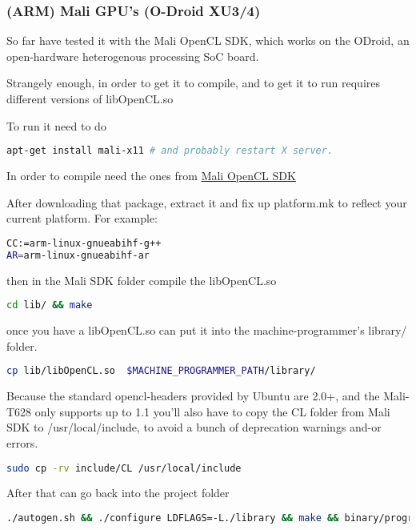 \documentclass[12pt]{article}
\begin{document}
\subsubsection{(ARM) Mali GPU's (O-Droid XU3/4)}

So far have tested it with the Mali OpenCL SDK, which works on the ODroid, an
open-hardware heterogenous processing SoC board.

Strangely enough, in order to get it to compile, and to get it to run requires
different versions of libOpenCL.so

To run it need to do
\begin{lstlisting}[language=bash]
apt-get install mali-x11 # and probably restart X server.
\end{lstlisting}

In order to compile need the ones from
\href{https://developer.arm.com/products/software/mali-sdks/mali-opencl-sdk/downloads}
{Mali OpenCL SDK}

After downloading that package, extract it and fix up platform.mk to reflect
your current platform. For example:
\begin{lstlisting}[language=bash]
CC:=arm-linux-gnueabihf-g++
AR=arm-linux-gnueabihf-ar
\end{lstlisting}

then in the Mali SDK folder compile the libOpenCL.so
\begin{lstlisting}[language=bash]
cd lib/ && make
\end{lstlisting}
once you have a libOpenCL.so can put it into the machine-programmer's 
library/ folder.
\begin{lstlisting}[language=bash]
cp lib/libOpenCL.so  $MACHINE_PROGRAMMER_PATH/library/
\end{lstlisting}

Because the standard opencl-headers provided by Ubuntu are 2.0+, and the
Mali-T628 only supports up to 1.1 you'll also have to copy the CL folder 
from Mali SDK to /usr/local/include, to avoid a bunch of deprecation
warnings and-or errors.
\begin{lstlisting}[language=bash]
sudo cp -rv include/CL /usr/local/include
\end{lstlisting}

After that can go back into the project folder
\begin{lstlisting}[language=bash]
./autogen.sh && ./configure LDFLAGS=-L./library && make && binary/programmer
\end{lstlisting}
\end{document}

